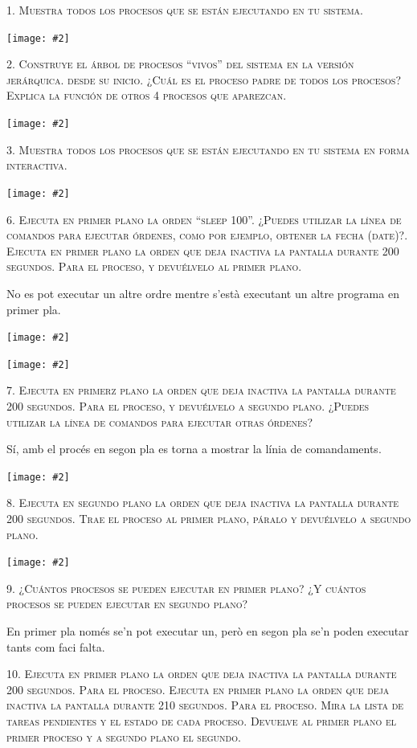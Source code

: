\documentclass[a4paper,12pt]{article}
\newcommand{\mygraphic}[2][height=0.4\textheight]{\begin{center}
		\centering\texttt{[image: \#2]}\par
\end{center}}
\begin{document}


\newpage
\textsc{1. Muestra todos los procesos que se están ejecutando en tu sistema.}
\mygraphic{imatges/1.png}

\textsc{2. Construye el árbol de procesos “vivos” del sistema en la versión jerárquica. desde su inicio. ¿Cuál es el proceso padre de todos los procesos? Explica la función de otros 4 procesos que aparezcan.}
\mygraphic{imatges/2.png}


\textsc{3. Muestra todos los procesos que se están ejecutando en tu sistema en forma interactiva.}
\mygraphic{imatges/3.png}

\newpage
\textsc{6. Ejecuta en primer plano la orden “sleep 100”. ¿Puedes utilizar la línea de comandos para ejecutar órdenes, como por ejemplo, obtener la fecha (date)?. Ejecuta en primer plano la orden que deja inactiva la pantalla durante 200 segundos. Para el proceso, y devuélvelo al primer plano.}

No es pot executar un altre ordre mentre s'està executant un altre programa en primer pla.
\mygraphic[height=0.37\textheight]{imatges/5.png}
\mygraphic[height=0.37\textheight]{imatges/6.png}


\textsc{7. Ejecuta en primerz plano la orden que deja inactiva la pantalla durante 200 segundos. Para el proceso, y devuélvelo a segundo plano. ¿Puedes utilizar la línea de comandos para ejecutar otras órdenes?}

Sí, amb el procés en segon pla es torna a mostrar la línia de comandaments.
\mygraphic[height=0.35\textheight]{imatges/6a.png}


\textsc{8. Ejecuta en segundo plano la orden que deja inactiva la pantalla durante 200 segundos. Trae el proceso al primer plano, páralo y devuélvelo a segundo plano.}

\mygraphic[height=0.35\textheight]{imatges/7.png}


\textsc{9. ¿Cuántos procesos se pueden ejecutar en primer plano? ¿Y cuántos procesos se pueden ejecutar en segundo plano?}

En primer pla només se'n pot executar un, però en segon pla se'n poden executar tants com faci falta.

\textsc{10. Ejecuta en primer plano la orden que deja inactiva la pantalla durante 200 segundos. Para el proceso. Ejecuta en primer plano la orden que deja inactiva la pantalla durante 210 segundos. Para el proceso. Mira la lista de tareas pendientes y el estado de cada proceso. Devuelve al primer plano el primer proceso y a segundo plano el segundo.}
\end{document}
